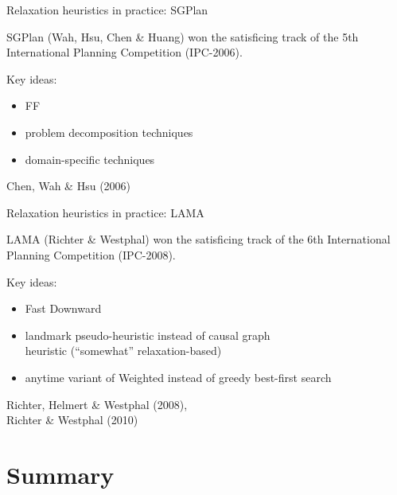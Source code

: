 \documentclass{gkibeamer}
\begin{document}
\begin{frame}{Relaxation heuristics in practice: SGPlan}
  \begin{example}[SGPlan]
    \alert{SGPlan} (Wah, Hsu, Chen \& Huang) won the satisficing
    track of the 5th International Planning Competition (IPC-2006).

    \smallskip
    
    Key ideas:
    \begin{itemize}
    \item \alert{FF}
    \item \alert{problem decomposition} techniques
    \item \alert{domain-specific techniques}
    \end{itemize}
  \end{example}
   Chen, Wah \& Hsu (2006)
\end{frame}

\begin{frame}{Relaxation heuristics in practice: LAMA}
  \begin{example}[LAMA]
    \alert{LAMA} (Richter \& Westphal) won the satisficing
    track of the 6th International Planning Competition (IPC-2008).

    \smallskip
    
    Key ideas:
    \begin{itemize}
    \item \alert{Fast Downward}
    \item \alert{landmark pseudo-heuristic} instead of causal graph \\
      heuristic (``somewhat'' relaxation-based)
    \item anytime variant of \alert{Weighted \astar} instead of greedy
      best-first search
    \end{itemize}
  \end{example}
   Richter, Helmert \& Westphal (2008), \\
  Richter \& Westphal (2010)
\end{frame}

\section*{Summary}
\end{document}
